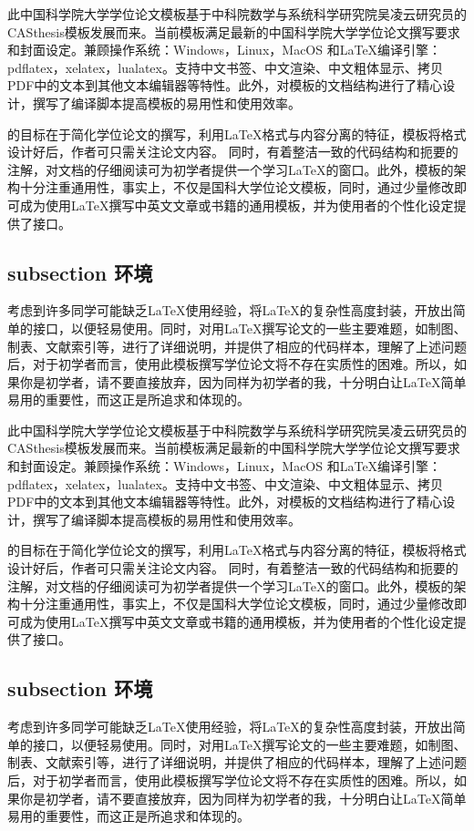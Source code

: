\documentclass[
  fontset = mac,
]{shtthesis}
\begin{document}
此中国科学院大学学位论文模板\shtthesis 基于中科院数学与系统科学研究院吴凌云研究员的CASthesis模板发展而来。当前\shtthesis 模板满足最新的中国科学院大学学位论文撰写要求和封面设定。兼顾操作系统：Windows，Linux，MacOS 和\LaTeX{}编译引擎：pdflatex，xelatex，lualatex。支持中文书签、中文渲染、中文粗体显示、拷贝PDF中的文本到其他文本编辑器等特性。此外，对模板的文档结构进行了精心设计，撰写了编译脚本提高模板的易用性和使用效率。

\shtthesis 的目标在于简化学位论文的撰写，利用\LaTeX{}格式与内容分离的特征，模板将格式设计好后，作者可只需关注论文内容。 同时，\shtthesis 有着整洁一致的代码结构和扼要的注解，对文档的仔细阅读可为初学者提供一个学习\LaTeX{}的窗口。此外，模板的架构十分注重通用性，事实上，\shtthesis 不仅是国科大学位论文模板，同时，通过少量修改即可成为使用\LaTeX{}撰写中英文文章或书籍的通用模板，并为使用者的个性化设定提供了接口。

\subsection{\ShtThesis subsection 环境}
考虑到许多同学可能缺乏\LaTeX{}使用经验，\shtthesis 将\LaTeX{}的复杂性高度封装，开放出简单的接口，以便轻易使用。同时，对用\LaTeX{}撰写论文的一些主要难题，如制图、制表、文献索引等，进行了详细说明，并提供了相应的代码样本，理解了上述问题后，对于初学者而言，使用此模板撰写学位论文将不存在实质性的困难。所以，如果你是初学者，请不要直接放弃，因为同样为初学者的我，十分明白让\LaTeX{}简单易用的重要性，而这正是\shtthesis 所追求和体现的。

此中国科学院大学学位论文模板\shtthesis 基于中科院数学与系统科学研究院吴凌云研究员的CASthesis模板发展而来。当前\shtthesis 模板满足最新的中国科学院大学学位论文撰写要求和封面设定。兼顾操作系统：Windows，Linux，MacOS 和\LaTeX{}编译引擎：pdflatex，xelatex，lualatex。支持中文书签、中文渲染、中文粗体显示、拷贝PDF中的文本到其他文本编辑器等特性。此外，对模板的文档结构进行了精心设计，撰写了编译脚本提高模板的易用性和使用效率。

\shtthesis 的目标在于简化学位论文的撰写，利用\LaTeX{}格式与内容分离的特征，模板将格式设计好后，作者可只需关注论文内容。 同时，\shtthesis 有着整洁一致的代码结构和扼要的注解，对文档的仔细阅读可为初学者提供一个学习\LaTeX{}的窗口。此外，模板的架构十分注重通用性，事实上，\shtthesis 不仅是国科大学位论文模板，同时，通过少量修改即可成为使用\LaTeX{}撰写中英文文章或书籍的通用模板，并为使用者的个性化设定提供了接口。

\subsection{\ShtThesis subsection 环境}
考虑到许多同学可能缺乏\LaTeX{}使用经验，\shtthesis 将\LaTeX{}的复杂性高度封装，开放出简单的接口，以便轻易使用。同时，对用\LaTeX{}撰写论文的一些主要难题，如制图、制表、文献索引等，进行了详细说明，并提供了相应的代码样本，理解了上述问题后，对于初学者而言，使用此模板撰写学位论文将不存在实质性的困难。所以，如果你是初学者，请不要直接放弃，因为同样为初学者的我，十分明白让\LaTeX{}简单易用的重要性，而这正是\shtthesis 所追求和体现的。
\end{document}
